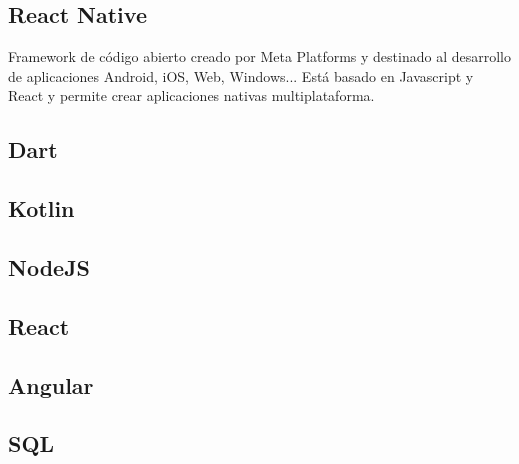 \subsection{React Native}
Framework de código abierto creado por Meta Platforms y destinado al desarrollo de aplicaciones Android, iOS, Web, Windows...
Está basado en Javascript y React y permite crear aplicaciones nativas multiplataforma.


\subsection{Dart}
\subsection{Kotlin}

\subsection{NodeJS}

\subsection{React}
\subsection{Angular}
\subsection{SQL}